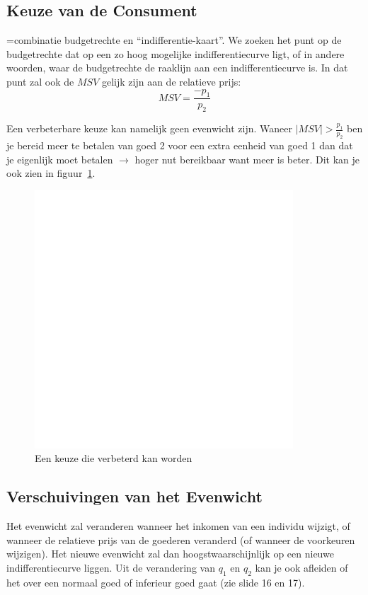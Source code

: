 \subsection{Keuze van de Consument}
=combinatie budgetrechte en ``indifferentie-kaart''. We zoeken het punt op de budgetrechte dat op een zo hoog mogelijke indifferentiecurve ligt, of in andere woorden, waar de budgetrechte de raaklijn aan een indifferentiecurve is. In dat punt zal ook de $MSV$ gelijk zijn aan de relatieve prijs:
\begin{equation}
	MSV = \frac{-p_1}{p_2}
\end{equation}

Een verbeterbare keuze kan namelijk geen evenwicht zijn. Waneer $|MSV| > \frac{p_1}{p_2}$ ben je bereid meer te betalen van goed 2 voor een extra eenheid van goed 1 dan dat je eigenlijk moet betalen $\rightarrow$ hoger nut bereikbaar want meer is beter. Dit kan je ook zien in figuur~\ref{fig:verbeterbareKeuze}.
\begin{figure}[htbp]
	\centering
	\includegraphics[scale=0.4]{Images/white.png}
	\caption{Een keuze die verbeterd kan worden}
	\label{fig:verbeterbareKeuze}
\end{figure}

\subsection{Verschuivingen van het Evenwicht}

Het evenwicht zal veranderen wanneer het inkomen van een individu wijzigt, of wanneer de relatieve prijs van de goederen veranderd (of wanneer de voorkeuren wijzigen). Het nieuwe evenwicht zal dan hoogstwaarschijnlijk op een nieuwe indifferentiecurve liggen. Uit de verandering van $q_1$ en $q_2$ kan je ook afleiden of het over een normaal goed of inferieur goed gaat (zie slide 16 en 17).

